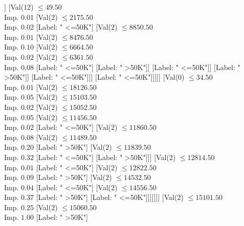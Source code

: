 \documentclass[margin=10pt]{standalone}
\begin{document}
\begin{forest}
															[Label: " >50K"]]
														[Val($12$) $ \leq 49.50$ \\ Imp. $0.01$
															[Val($2$) $ \leq 2175.50$ \\ Imp. $0.02$
																[Label: " <=50K"]
																[Val($2$) $ \leq 8850.50$ \\ Imp. $0.01$
																	[Val($2$) $ \leq 8476.50$ \\ Imp. $0.10$
																		[Val($2$) $ \leq 6664.50$ \\ Imp. $0.02$
																			[Val($2$) $ \leq 6361.50$ \\ Imp. $0.08$
																				[Label: " <=50K"]
																				[Label: " >50K"]]
																			[Label: " <=50K"]]
																		[Label: " >50K"]]
																	[Label: " <=50K"]]]
															[Label: " <=50K"]]]]]
											[Val($0$) $ \leq 34.50$ \\ Imp. $0.01$
												[Val($2$) $ \leq 18126.50$ \\ Imp. $0.05$
													[Val($2$) $ \leq 15103.50$ \\ Imp. $0.02$
														[Val($2$) $ \leq 15052.50$ \\ Imp. $0.05$
															[Val($2$) $ \leq 11456.50$ \\ Imp. $0.02$
																[Label: " <=50K"]
																[Val($2$) $ \leq 11860.50$ \\ Imp. $0.08$
																	[Val($2$) $ \leq 11489.50$ \\ Imp. $0.20$
																		[Label: " >50K"]
																		[Val($2$) $ \leq 11839.50$ \\ Imp. $0.32$
																			[Label: " <=50K"]
																			[Label: " >50K"]]]
																	[Val($2$) $ \leq 12814.50$ \\ Imp. $0.01$
																		[Label: " <=50K"]
																		[Val($2$) $ \leq 12822.50$ \\ Imp. $0.09$
																			[Label: " >50K"]
																			[Val($2$) $ \leq 14532.50$ \\ Imp. $0.04$
																				[Label: " <=50K"]
																				[Val($2$) $ \leq 14556.50$ \\ Imp. $0.37$
																					[Label: " >50K"]
																					[Label: " <=50K"]]]]]]]
															[Val($2$) $ \leq 15101.50$ \\ Imp. $0.25$
																[Val($2$) $ \leq 15060.50$ \\ Imp. $1.00$
																	[Label: " >50K"]

\end{forest}
\end{document}
